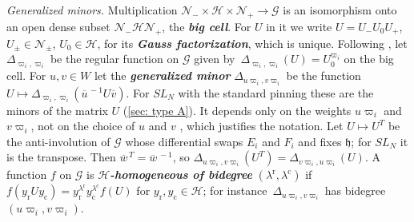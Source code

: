 \documentclass[a4paper]{amsart}
\numberwithin{equation}{section}
\theoremstyle{definition}
\theoremstyle{remark}
\newcommand{\mfh}{\mathfrak{h}}
\newcommand{\mcG}{\mathcal{G}}
\newcommand{\mcH}{\mathcal{H}}
\newcommand{\mcN}{\mathcal{N}}
\newcommand{\rr}{\mathrm{r}}
\newcommand{\cc}{\mathrm{c}}
\newcommand{\newword}[1]{\textbf{\emph{#1}}}
\begin{document}
\emph{Generalized minors.} Multiplication $\mcN_-\times\mcH\times\mcN_+\to\mcG$ is an isomorphism onto an open dense subset $\mcN_-\mcH\mcN_+$, the \newword{big cell}.
For $U$ in it we write $U=U_-U_0U_+$, $U_\pm\in\mcN_\pm$, $U_0\in\mcH$, for its \newword{Gauss factorization}, which is unique.
Following \cite{FZ99}, let $\Delta_{\varpi_i,\varpi_i}$ be the regular function on $\mcG$ given by~$\Delta_{\varpi_i,\varpi_i}(U)=U_0^{\varpi_i}$ on the big cell.
For $u,v\in W$ let the \newword{generalized minor} $\Delta_{u\varpi_i,v\varpi_i}$ be the function $U\mapsto\Delta_{\varpi_i,\varpi_i}(\overline{u}^{\,-1}U\overline{v})$.
For $SL_N$ with the standard pinning these are the minors of the matrix $U$ (\cref{sec: type A}).
It depends only on the weights $u\varpi_i$ and $v\varpi_i$, not on the choice of $u$ and $v$ \cite[Section~2.3]{FZ99}, which justifies the notation.
Let $U\mapsto U^T$ be the anti-involution of $\mcG$ whose differential swaps $E_i$ and $F_i$ and fixes $\mfh$; for $SL_N$ it is the transpose.
Then $\overline{w}^{\,T}=\overline{w}^{\,-1}$, so $\Delta_{u\varpi_i,v\varpi_i}(U^T)=\Delta_{v\varpi_i,u\varpi_i}(U)$.
A function $f$ on $\mcG$ is \newword{$\mcH$-homogeneous of bidegree} $(\lambda^\rr,\lambda^\cc)$ if $f(y_{\rr}Uy_{\cc})=y_{\rr}^{\lambda^\rr}y_{\cc}^{\lambda^\cc}f(U)$ for $y_{\rr},y_{\cc}\in\mcH$; for instance~$\Delta_{u\varpi_i,v\varpi_i}$ has bidegree $(u\varpi_i,v\varpi_i)$.
\end{document}
